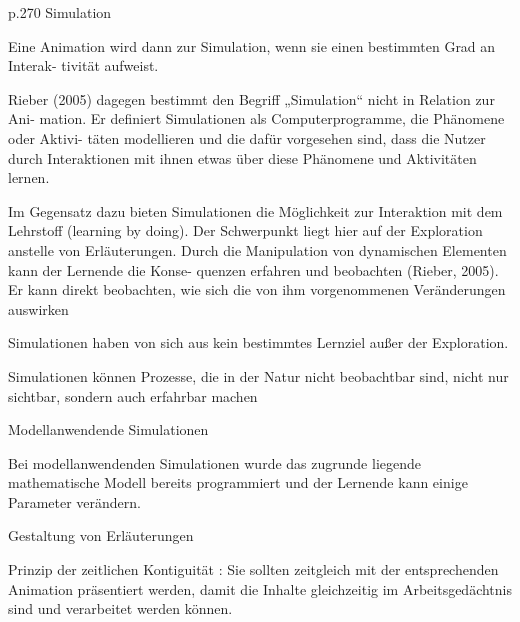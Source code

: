 p.270
Simulation

Eine Animation wird dann zur Simulation, wenn sie einen bestimmten Grad an Interak-
tivität aufweist. 

Rieber (2005) dagegen bestimmt den Begriff „Simulation“ nicht in Relation zur Ani-
mation. Er definiert Simulationen als Computerprogramme, die Phänomene oder Aktivi-
täten modellieren und die dafür vorgesehen sind, dass die Nutzer durch Interaktionen 
mit ihnen etwas über diese Phänomene und Aktivitäten lernen.

Im Gegensatz dazu 
bieten  Simulationen  die  Möglichkeit  zur  Interaktion  mit  dem  Lehrstoff  (learning  by 
doing). Der Schwerpunkt liegt hier auf der Exploration anstelle von Erläuterungen. 
Durch die Manipulation von dynamischen Elementen kann der Lernende die Konse-
quenzen erfahren und beobachten (Rieber, 2005). Er kann direkt beobachten, wie sich 
die von ihm vorgenommenen Veränderungen auswirken 

Simulationen  haben  von  sich  aus  kein  bestimmtes  Lernziel  außer  der  Exploration. 

Simulationen  können  Prozesse,  die  in  der  Natur  nicht  beobachtbar  sind,  nicht  nur 
sichtbar, sondern auch erfahrbar machen

Modellanwendende Simulationen 

Bei  modellanwendenden  Simulationen  wurde  das  zugrunde  liegende  mathematische 
Modell bereits programmiert und der Lernende kann einige Parameter verändern. 

Gestaltung von Erläuterungen 

Prinzip der zeitlichen Kontiguität :
Sie sollten zeitgleich mit der entsprechenden Animation präsentiert werden, damit die 
Inhalte gleichzeitig im Arbeitsgedächtnis sind und verarbeitet werden können.